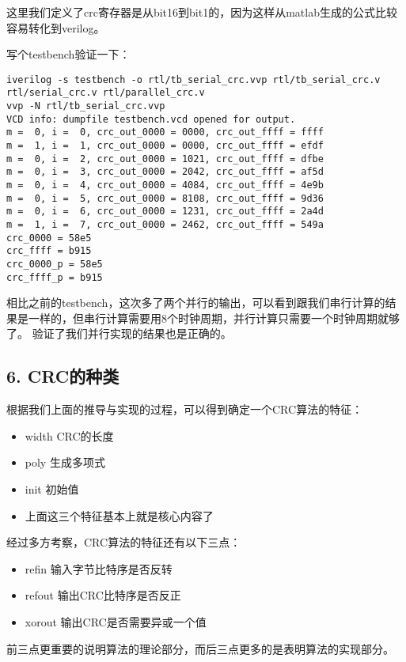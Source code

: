 \documentclass[
]{article}
\begin{document}
这里我们定义了crc寄存器是从bit16到bit1的，因为这样从matlab生成的公式比较容易转化到verilog。


写个testbench验证一下：

\begin{verbatim}
iverilog -s testbench -o rtl/tb_serial_crc.vvp rtl/tb_serial_crc.v rtl/serial_crc.v rtl/parallel_crc.v
vvp -N rtl/tb_serial_crc.vvp
VCD info: dumpfile testbench.vcd opened for output.
m =  0, i =  0, crc_out_0000 = 0000, crc_out_ffff = ffff
m =  1, i =  1, crc_out_0000 = 0000, crc_out_ffff = efdf
m =  0, i =  2, crc_out_0000 = 1021, crc_out_ffff = dfbe
m =  0, i =  3, crc_out_0000 = 2042, crc_out_ffff = af5d
m =  0, i =  4, crc_out_0000 = 4084, crc_out_ffff = 4e9b
m =  0, i =  5, crc_out_0000 = 8108, crc_out_ffff = 9d36
m =  0, i =  6, crc_out_0000 = 1231, crc_out_ffff = 2a4d
m =  1, i =  7, crc_out_0000 = 2462, crc_out_ffff = 549a
crc_0000 = 58e5
crc_ffff = b915
crc_0000_p = 58e5
crc_ffff_p = b915
\end{verbatim}

相比之前的testbench，这次多了两个并行的输出，可以看到跟我们串行计算的结果是一样的，但串行计算需要用8个时钟周期，并行计算只需要一个时钟周期就够了。
验证了我们并行实现的结果也是正确的。
\newpage
\hypertarget{header-n273}{%
\subsection{6. CRC的种类}\label{header-n273}}

根据我们上面的推导与实现的过程，可以得到确定一个CRC算法的特征：

\begin{itemize}
\item
  width CRC的长度
\item
  poly 生成多项式
\item
  init 初始值
\item
  上面这三个特征基本上就是核心内容了
\end{itemize}

经过多方考察，CRC算法的特征还有以下三点：

\begin{itemize}
\item
  refin 输入字节比特序是否反转
\item
  refout 输出CRC比特序是否反正
\item
  xorout 输出CRC是否需要异或一个值
\end{itemize}

前三点更重要的说明算法的理论部分，而后三点更多的是表明算法的实现部分。
\end{document}
